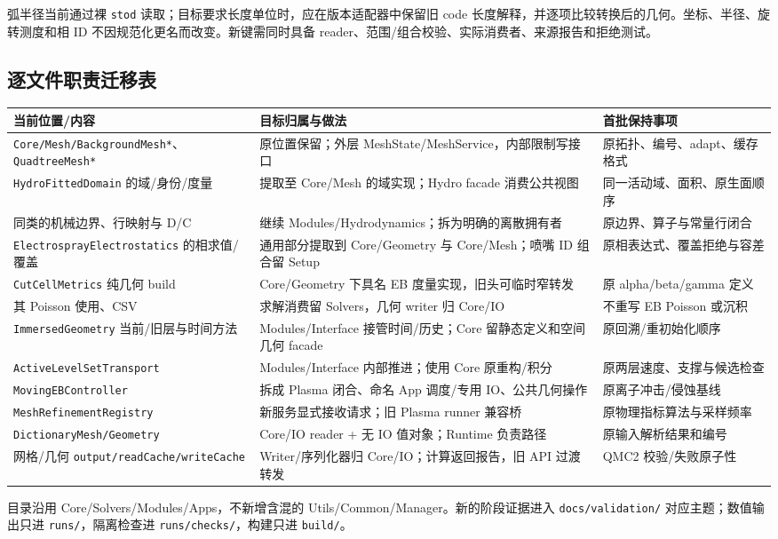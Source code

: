 \documentclass[UTF8,a4paper,11pt,fontset=fandol]{ctexart}
\newcommand{\code}[1]{\nolinkurl{#1}}
\begin{document}
弧半径当前通过裸 \code{stod} 读取；目标要求长度单位时，应在版本适配器中保留旧 code 长度解释，并逐项比较转换后的几何。坐标、半径、旋转测度和相 ID 不因规范化更名而改变。新键需同时具备 reader、范围/组合校验、实际消费者、来源报告和拒绝测试。

\subsection{逐文件职责迁移表}
\begin{longtable}{@{}P{.34\textwidth}P{.36\textwidth}P{.24\textwidth}@{}}
\toprule 当前位置/内容 & 目标归属与做法 & 首批保持事项\\\midrule\endhead
\code{Core/Mesh/BackgroundMesh*}、\code{QuadtreeMesh*} & 原位置保留；外层 MeshState/MeshService，内部限制写接口 & 原拓扑、编号、adapt、缓存格式\\
\code{HydroFittedDomain} 的域/身份/度量 & 提取至 Core/Mesh 的域实现；Hydro facade 消费公共视图 & 同一活动域、面积、原生面顺序\\
同类的机械边界、行映射与 D/C & 继续 Modules/Hydrodynamics；拆为明确的离散拥有者 & 原边界、算子与常量行闭合\\
\code{ElectrosprayElectrostatics} 的相求值/覆盖 & 通用部分提取到 Core/Geometry 与 Core/Mesh；喷嘴 ID 组合留 Setup & 原相表达式、覆盖拒绝与容差\\
\code{CutCellMetrics} 纯几何 build & Core/Geometry 下具名 EB 度量实现，旧头可临时窄转发 & 原 alpha/beta/gamma 定义\\
其 Poisson 使用、CSV & 求解消费留 Solvers，几何 writer 归 Core/IO & 不重写 EB Poisson 或沉积\\
\code{ImmersedGeometry} 当前/旧层与时间方法 & Modules/Interface 接管时间/历史；Core 留静态定义和空间几何 facade & 原回溯/重初始化顺序\\
\code{ActiveLevelSetTransport} & Modules/Interface 内部推进；使用 Core 原重构/积分 & 原两层速度、支撑与候选检查\\
\code{MovingEBController} & 拆成 Plasma 闭合、命名 App 调度/专用 IO、公共几何操作 & 原离子冲击/侵蚀基线\\
\code{MeshRefinementRegistry} & 新服务显式接收请求；旧 Plasma runner 兼容桥 & 原物理指标算法与采样频率\\
\code{DictionaryMesh/Geometry} & Core/IO reader + 无 IO 值对象；Runtime 负责路径 & 原输入解析结果和编号\\
网格/几何 \code{output/readCache/writeCache} & Writer/序列化器归 Core/IO；计算返回报告，旧 API 过渡转发 & QMC2 校验/失败原子性\\
\bottomrule
\end{longtable}
目录沿用 Core/Solvers/Modules/Apps，不新增含混的 Utils/Common/Manager。新的阶段证据进入 \code{docs/validation/} 对应主题；数值输出只进 \code{runs/}，隔离检查进 \code{runs/checks/}，构建只进 \code{build/}。
\end{document}
